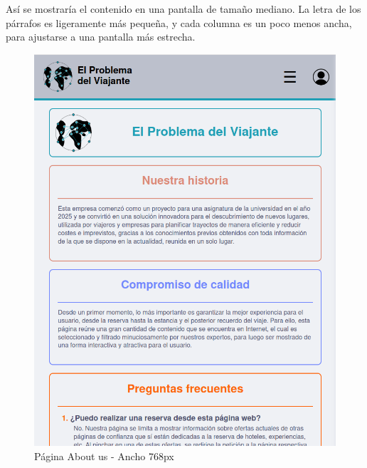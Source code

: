 \documentclass[11pt, a4paper]{book}
\begin{document}
	Así se mostraría el contenido en una pantalla de tamaño mediano. La letra de los párrafos es ligeramente más pequeña, y cada columna es un poco menos ancha, para ajustarse a una pantalla más estrecha.

	\begin{figure} [H]
		\centering
		\includegraphics[height=0.4\textheight]{CSS/3-5 768.png}
		\caption{Página About us - Ancho 768px}
	\end{figure}
\end{document}
